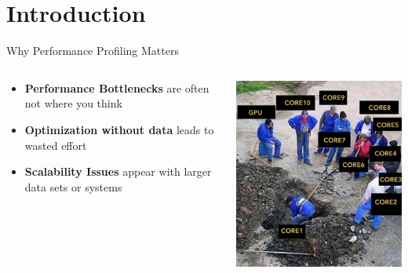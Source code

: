 \section{Introduction}

\begin{frame}{Why Performance Profiling Matters}
    \begin{columns}
        \begin{column}{0.6\textwidth}
            \begin{itemize}
                \item \textbf{Performance Bottlenecks} are often not where you think
                \item \textbf{Optimization without data} leads to wasted effort
                \item \textbf{Scalability Issues} appear with larger data sets or systems
            \end{itemize}
            
        \end{column}
        \begin{column}{0.4\textwidth}
            \centering
            \includegraphics[width=\textwidth]{img/intro1.png}
        \end{column}
    \end{columns}
\end{frame}

